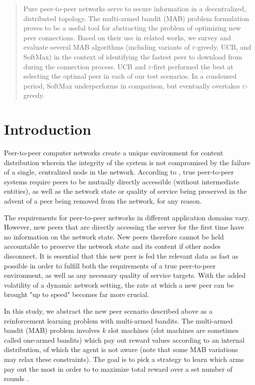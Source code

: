 \documentclass{article}
\begin{document}
\begin{abstract}
Pure peer-to-peer networks serve to secure information in a decentralized, distributed topology. The multi-armed bandit (MAB) problem formulation proves to be a useful 
tool for abstracting the problem of optimizing new peer connections. Based on their use in related works, we survey and evaluate several MAB algorithms (including 
variants of $\varepsilon$-greedy, UCB, and SoftMax) in the context of identifying the fastest peer to download from during the connection process. UCB and 
$\varepsilon$-first performed the best at selecting the optimal peer in each of our test scenarios. In a condensed period, SoftMax underperforms in comparison, 
but eventually overtakes $\varepsilon$-greedy. 

\end{abstract}

\section{Introduction}
Peer-to-peer computer networks create a unique environment for content distribution wherein the integrity of the system is not compromised by the failure of 
a single, centralized node in the network. According to \cite{p2p_def}, true peer-to-peer systems require peers to be mutually directly accessible (without 
intermediate entities), as well as the network state or quality of service being preserved in the advent of a peer being removed from the network, for any 
reason.

The requirements for peer-to-peer networks in different application domains vary. However, new peers that are directly accessing the server for the first time 
have no information on the network state. New peers therefore cannot be held accountable to preserve the network state and its content if other nodes disconnect. 
It is essential that this new peer is fed the relevant data as fast as possible in order to fulfill both the requirements of a true peer-to-peer environment, as 
well as any necessary quality of service targets. With the added volatility of a dynamic network setting, the rate at which a new peer can be brought "up to speed" 
becomes far more crucial.

In this study, we abstract the new peer scenario described above as a reinforcement learning problem with multi-armed bandits. The multi-armed bandit (MAB) problem 
involves $k$ slot machines (slot machines are sometimes called one-armed bandits) which pay out reward values according to an internal distribution, of which the agent 
is not aware (note that some MAB variations may relax these constraints). The goal is to pick a strategy to learn which arms pay out the most in order to to maximize 
total reward over a set number of rounds \cite{mab_algos}. 
\end{document}
